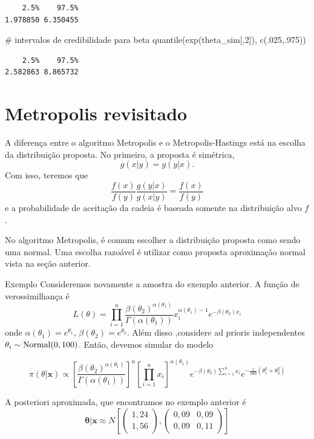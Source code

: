 \documentclass[
  letterpaper,
  DIV=11,
  numbers=noendperiod]{scrreprt}
\newenvironment{Shaded}{\begin{snugshade}}{\end{snugshade}}
\newcommand{\CommentTok}[1]{\textcolor[rgb]{0.37,0.37,0.37}{#1}}
\newcommand{\DecValTok}[1]{\textcolor[rgb]{0.68,0.00,0.00}{#1}}
\newcommand{\FunctionTok}[1]{\textcolor[rgb]{0.28,0.35,0.67}{#1}}
\newcommand{\NormalTok}[1]{\textcolor[rgb]{0.00,0.23,0.31}{#1}}
\theoremstyle{definition}
\theoremstyle{definition}
\theoremstyle{plain}
\theoremstyle{remark}
\begin{document}
\begin{verbatim}
    2.5%    97.5% 
1.978850 6.350455 
\end{verbatim}

\begin{Shaded}
\begin{Highlighting}[]
\CommentTok{\# intervalos de credibilidade para beta}
\FunctionTok{quantile}\NormalTok{(}\FunctionTok{exp}\NormalTok{(theta\_sim[,}\DecValTok{2}\NormalTok{]), }\FunctionTok{c}\NormalTok{(.}\DecValTok{025}\NormalTok{,.}\DecValTok{975}\NormalTok{))}
\end{Highlighting}
\end{Shaded}

\begin{verbatim}
    2.5%    97.5% 
2.582863 8.865732 
\end{verbatim}

\section{Metropolis revisitado}\label{metropolis-revisitado}

A diferença entre o algoritmo Metropolis e o Metropolis-Hastings está na
escolha da distribuição proposta. No primeiro, a proposta é simétrica,
\[g(x|y)=g(y|x).\] Com isso, teremos que
\[\frac{f(x)}{f(y)}\frac{g(y|x)}{g(x|y)}=\frac{f(x)}{f(y)}\] e a
probabilidade de aceitação da cadeia é baseada somente na distribuição
alvo \(f\).

No algoritmo Metropolis, é comum escolher a distribuição proposta como
sendo uma normal. Uma escolha razoável é utilizar como proposta
aproximação normal vista na seção anterior.

Exemplo Consideremos novamente a amostra do exemplo anterior. A função
de verossimilhança é
\[L(\theta)=\prod_{i=1}^n \frac{\beta(\theta_2)^{\alpha(\theta_1)}}{\Gamma(\alpha(\theta_1))} x_i^{\alpha(\theta_1)-1}e^{-\beta(\theta_2)x_i}\]
onde \(\alpha(\theta_1)=e^{\theta_1}\),
\(\beta(\theta_2)=e^{\theta_2}\). Além disso ,considere ad prioris
independentes \(\theta_i\sim\hbox{Normal}(0,100)\). Então, devemos
simular do modelo

\[\pi(\theta|\boldsymbol{x})\propto \left[\frac{\beta(\theta_2)^{\alpha(\theta_1)}}{\Gamma(\alpha(\theta_1))}\right]^n \left[\prod_{i=1}^n x_i\right]^{\alpha(\theta_1)}e^{-\beta(\theta_2)\sum_{i=1}^{n}x_i}e^{-\frac{1}{200}(\theta_1^2 + \theta_2^2)}\]

A posteriori aproximada, que encontramos no exemplo anterior é
\[\boldsymbol{\theta}|\boldsymbol{x}\approx N \left[ \left(\begin{array}{c}1,24\\1,56 \end{array}\right),\left(\begin{array}{cc}0,09 & 0,09\\0,09 &0,11\end{array}\right)\right]\]
\end{document}
